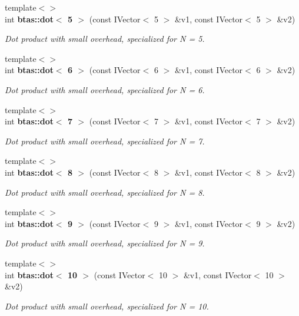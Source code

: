\begin{DoxyCompactItemize}
{\footnotesize template$<$$>$ }\\int {\bf btas\-::dot$<$ 5 $>$} (const I\-Vector$<$ 5 $>$ \&v1, const I\-Vector$<$ 5 $>$ \&v2)
\begin{DoxyCompactList}\small\item\em Dot product with small overhead, specialized for N = 5. \end{DoxyCompactList}\item 
{\footnotesize template$<$$>$ }\\int {\bf btas\-::dot$<$ 6 $>$} (const I\-Vector$<$ 6 $>$ \&v1, const I\-Vector$<$ 6 $>$ \&v2)
\begin{DoxyCompactList}\small\item\em Dot product with small overhead, specialized for N = 6. \end{DoxyCompactList}\item 
{\footnotesize template$<$$>$ }\\int {\bf btas\-::dot$<$ 7 $>$} (const I\-Vector$<$ 7 $>$ \&v1, const I\-Vector$<$ 7 $>$ \&v2)
\begin{DoxyCompactList}\small\item\em Dot product with small overhead, specialized for N = 7. \end{DoxyCompactList}\item 
{\footnotesize template$<$$>$ }\\int {\bf btas\-::dot$<$ 8 $>$} (const I\-Vector$<$ 8 $>$ \&v1, const I\-Vector$<$ 8 $>$ \&v2)
\begin{DoxyCompactList}\small\item\em Dot product with small overhead, specialized for N = 8. \end{DoxyCompactList}\item 
{\footnotesize template$<$$>$ }\\int {\bf btas\-::dot$<$ 9 $>$} (const I\-Vector$<$ 9 $>$ \&v1, const I\-Vector$<$ 9 $>$ \&v2)
\begin{DoxyCompactList}\small\item\em Dot product with small overhead, specialized for N = 9. \end{DoxyCompactList}\item 
{\footnotesize template$<$$>$ }\\int {\bf btas\-::dot$<$ 10 $>$} (const I\-Vector$<$ 10 $>$ \&v1, const I\-Vector$<$ 10 $>$ \&v2)
\begin{DoxyCompactList}\small\item\em Dot product with small overhead, specialized for N = 10. \end{DoxyCompactList}\item 

\end{DoxyCompactItemize}
